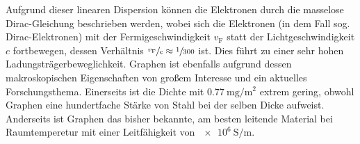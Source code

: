 Aufgrund dieser linearen Dispersion können die Elektronen durch die masselose Dirac-Gleichung beschrieben werden, wobei sich 
die Elektronen (in dem Fall sog. Dirac-Elektronen) mit der Fermigeschwindigkeit $v_\text{F}$ statt der Lichtgeschwindigkeit $c$ fortbewegen,
dessen Verhältnis $\sfrac{v_\text{F}}{c} \approx \sfrac{1}{300}$ ist.\cite{Avouris2007}
Dies führt zu einer sehr hohen Ladungsträgerbeweglichkeit.\cite{https://doi.org/10.1002/adma.201201482}
Graphen ist ebenfalls aufgrund dessen makroskopischen Eigenschaften von großem Interesse und ein aktuelles Forschungsthema.
Einerseits ist die  Dichte mit $\qty{0.77}{\milli\gram\per\metre\squared}$ extrem gering, obwohl 
Graphen eine hundertfache Stärke von Stahl bei der selben Dicke aufweist.\cite{graphene_properties} 
Anderseits ist Graphen das bisher bekannte, am besten leitende Material bei Raumtemperetur mit einer Leitfähigkeit von 
$\qty{e6}{\siemens\per\metre}$.\cite{graphene_properties}